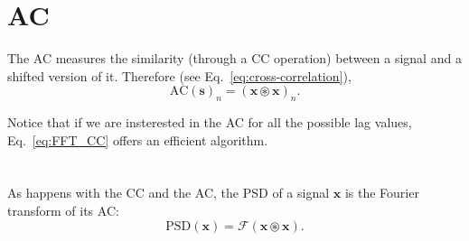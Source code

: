 
\section{\acrlong{AC}} %
\label{sec:auto-correlation}

The \gls{AC} measures the similarity (through a \gls{CC} operation)
between a signal and a shifted version of it. Therefore (see
Eq.~\ref{eq:cross-correlation}),
\begin{equation}
  \text{AC}(\mathbf{s})_n = (\mathbf{x}\circledast\mathbf{x})_n.
\end{equation}

Notice that if we are insterested in the \gls{AC} for all the possible
lag values, Eq.~\ref{eq:FFT_CC} offers an efficient algorithm.





\section{}
\label{sec:PSD}

As happens with the \gls{CC} and the \gls{AC}, the \acrshort{PSD} of a
signal $\mathbf{x}$ is the Fourier transform of its \gls{AC}:
\begin{equation}
  \text{PSD}(\mathbf{x}) = \mathcal{F}(\mathbf{x}\circledast\mathbf{x}).
\end{equation}

